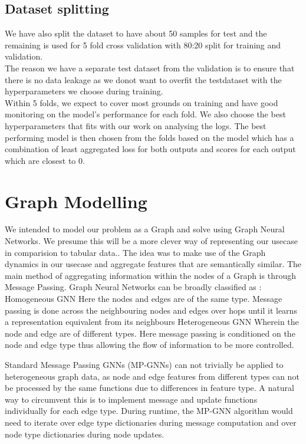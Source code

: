 \documentclass{report} %
\begin{document}
\section{Dataset splitting}\label{sec:Dataset splitting}

We have also split the dataset to have about 50 samples for test and the remaining is used for 5 fold cross validation with 80:20 split for training and validation. \\
The reason we have a separate test dataset from the validation is to ensure that there is no data leakage as we donot want to overfit the testdataset with the hyperparameters we choose during training. \\

Within 5 folds, we expect to cover most grounds on training and have good monitoring on the model's performance for each fold.
We also choose the best hyperparameters that fits with our work on analysing the logs.
The best performing model is then chosen from the folds based on the model which has a combination of least aggregated loss for both outputs and scores for each output which are closest to 0.


\chapter{Graph Modelling} 

We intended to model our problem as a Graph and solve using Graph Neural Networks. 
We presume this will be a more clever way of representing our usecase in comparision to tabular data..
The idea was to make use of the Graph dynamics in our usecase and aggregate features that are semantically similar.
The main method of aggregating information within the nodes of a Graph is through Message Passing.
Graph Neural Networks can be broadly classified as :
Homogeneous GNN
Here the nodes and edges are of the same type. Message passing is done across the neighbouring nodes and edges over hops until it learns a representation equivalent from its neighbours
Heterogeneous GNN
Wherein the node and edge are of different types. Here message passing is conditioned on the node and edge type thus allowing the flow of information to be more controlled.

Standard Message Passing GNNs (MP-GNNs) can not trivially be applied to heterogeneous graph data, as node and edge features from different types can not be processed by the same functions due to differences in feature type. 
A natural way to circumvent this is to implement message and update functions individually for each edge type. 
During runtime, the MP-GNN algorithm would need to iterate over edge type dictionaries during message computation and over node type dictionaries during node updates.
\end{document}
